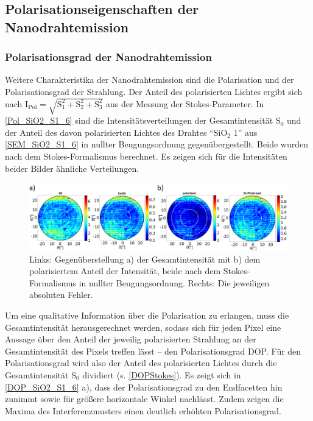 \subsection{Polarisationseigenschaften der Nanodrahtemission}
\label{PolGradSiO2}
\subsubsection{Polarisationsgrad der Nanodrahtemission}
Weitere Charakteristika der Nanodrahtemission sind die Polarisation und der Polarisationsgrad der Strahlung. Der Anteil des polarisierten Lichtes ergibt sich nach $\text{I}_\text{Pol}=\sqrt{\text{S}_\text{1}^\text{2}+\text{S}_\text{2}^\text{2}+\text{S}_\text{3}^\text{2}}$ aus der Messung der Stokes-Parameter. In \autoref{Pol_SiO2_S1_6} sind die Intensitätsverteilungen der Gesamtintensität $\text{S}_\text{0}$  und der Anteil des davon polarisierten Lichtes des Drahtes ``SiO$_\text{2}$ 1'' aus \autoref{SEM_SiO2_S1_6} in nullter Beugungsordnung gegenübergestellt. Beide wurden nach dem Stokes-Formalismus berechnet. Es zeigen sich für die Intensitäten beider Bilder ähnliche Verteilungen.\begin{figure}[b]
\centering
\includegraphics[width=1\textwidth]{Bilder/SiO2/Pol_SiO2_S1_6}
\caption{Links: Gegenüberstellung a) der Gesamtintensität mit b) dem polarisiertem Anteil der Intensität, beide nach dem Stokes-Formalismus in nullter Beugungsordnung. Rechts: Die jeweiligen absoluten Fehler.}
\label{Pol_SiO2_S1_6}
\end{figure}Um eine qualitative Information über die Polarisation zu erlangen, muss die Gesamtintensität herausgerechnet werden, sodass sich für jeden Pixel eine Aussage über den Anteil der jeweilig polarisierten Strahlung an der Gesamtintensität des Pixels treffen lässt – den Polarisationsgrad DOP. Für den Polarisationsgrad wird also der Anteil des polarisierten Lichtes durch die Gesamtintensität S$_\text{0}$ dividiert (s. \autoref{DOPStokes}). Es zeigt sich in \autoref{DOP_SiO2_S1_6} a), dass der Polarisationsgrad zu den Endfacetten hin zunimmt sowie für größere horizontale Winkel nachlässt. Zudem zeigen die Maxima des Interferenzmusters einen deutlich erhöhten Polarisationsgrad.\begin{figure}[b]

\end{figure}
